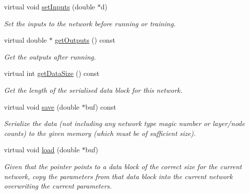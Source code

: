 \begin{DoxyCompactItemize}
virtual void \hyperlink{classOutputBlendingNet_a0ecd8c43dfce07092a8e7de0fc734bd4}{set\+Inputs} (double $\ast$d)
\begin{DoxyCompactList}\small\item\em Set the inputs to the network before running or training. \end{DoxyCompactList}\item 
virtual double $\ast$ \hyperlink{classOutputBlendingNet_a6ea58b1ae8d0f5e6ff3b0f616de63eb5}{get\+Outputs} () const 
\begin{DoxyCompactList}\small\item\em Get the outputs after running. \end{DoxyCompactList}\item 
virtual int \hyperlink{classOutputBlendingNet_a1196e5ab4cc8326308395d91f7128454}{get\+Data\+Size} () const 
\begin{DoxyCompactList}\small\item\em Get the length of the serialised data block for this network. \end{DoxyCompactList}\item 
virtual void \hyperlink{classOutputBlendingNet_a9520621635c8b05d472be9185a341475}{save} (double $\ast$buf) const 
\begin{DoxyCompactList}\small\item\em Serialize the data (not including any network type magic number or layer/node counts) to the given memory (which must be of sufficient size). \end{DoxyCompactList}\item 
virtual void \hyperlink{classOutputBlendingNet_a97c9054693c98b2771763b38c5576d47}{load} (double $\ast$buf)
\begin{DoxyCompactList}\small\item\em Given that the pointer points to a data block of the correct size for the current network, copy the parameters from that data block into the current network overwriting the current parameters. \end{DoxyCompactList}\end{DoxyCompactItemize}
